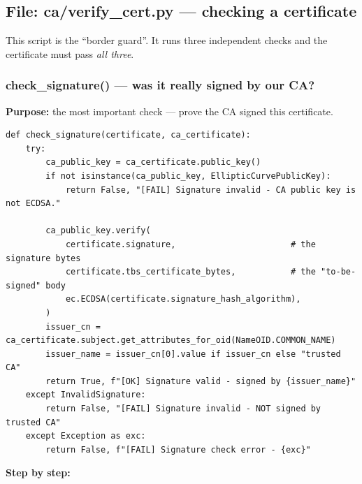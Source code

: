 \documentclass[11pt,a4paper]{report}
\begin{document}
\subsection{File: ca/verify\_cert.py --- checking a certificate}

This script is the ``border guard''. It runs three independent checks and the
certificate must pass \emph{all three}.

\subsubsection*{check\_signature() --- was it really signed by our CA?}
\textbf{Purpose:} the most important check --- prove the CA signed this certificate.
\begin{lstlisting}[style=py,caption={ca/verify\_cert.py --- verify the CA's signature on a certificate.}]
def check_signature(certificate, ca_certificate):
    try:
        ca_public_key = ca_certificate.public_key()
        if not isinstance(ca_public_key, EllipticCurvePublicKey):
            return False, "[FAIL] Signature invalid - CA public key is not ECDSA."

        ca_public_key.verify(
            certificate.signature,                       # the signature bytes
            certificate.tbs_certificate_bytes,           # the "to-be-signed" body
            ec.ECDSA(certificate.signature_hash_algorithm),
        )
        issuer_cn = ca_certificate.subject.get_attributes_for_oid(NameOID.COMMON_NAME)
        issuer_name = issuer_cn[0].value if issuer_cn else "trusted CA"
        return True, f"[OK] Signature valid - signed by {issuer_name}"
    except InvalidSignature:
        return False, "[FAIL] Signature invalid - NOT signed by trusted CA"
    except Exception as exc:
        return False, f"[FAIL] Signature check error - {exc}"
\end{lstlisting}
\textbf{Step by step:}
\end{document}
